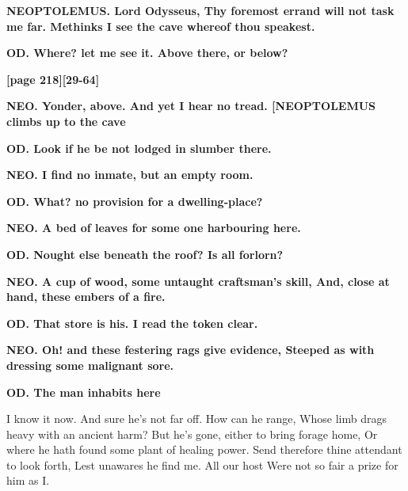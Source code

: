 \documentclass[11pt,letter]{book}
\begin{document}
\par \textbf{NEOPTOLEMUS. Lord Odysseus, Thy foremost errand will not task me far. Methinks I see the cave whereof thou speakest.}
\par 

\par \textbf{OD. Where? let me see it. Above there, or below?}
\par 

\par \textbf{[page 218][29-64]}
\par 

\par \textbf{NEO. Yonder, above. And yet I hear no tread. [NEOPTOLEMUS climbs up to the cave}
\par 

\par \textbf{OD. Look if he be not lodged in slumber there.}
\par 

\par \textbf{NEO. I find no inmate, but an empty room.}
\par 

\par \textbf{OD. What? no provision for a dwelling-place?}
\par 

\par \textbf{NEO. A bed of leaves for some one harbouring here.}
\par 

\par \textbf{OD. Nought else beneath the roof? Is all forlorn?}
\par 

\par \textbf{NEO. A cup of wood, some untaught craftsman’s skill, And, close at hand, these embers of a fire.}
\par 

\par \textbf{OD. That store is his. I read the token clear.}
\par 

\par \textbf{NEO. Oh! and these festering rags give evidence, Steeped as with dressing some malignant sore.}
\par 

\par \textbf{OD. The man inhabits here}
\par   I know it now. And sure he’s not far off. How can he range, Whose limb drags heavy with an ancient harm? But he’s gone, either to bring forage home, Or where he hath found some plant of healing power. Send therefore thine attendant to look forth, Lest unawares he find me. All our host Were not so fair a prize for him as I.
\end{document}
